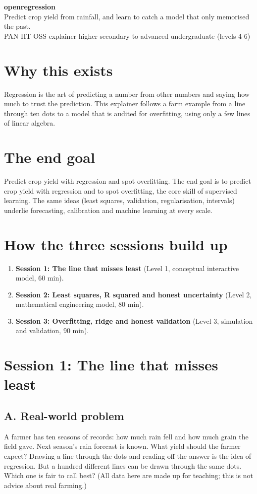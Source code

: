 \documentclass[11pt,a4paper]{article}
\begin{document}
\begin{center}{\LARGE\bfseries openregression}\\[0.4em]{\large Predict crop yield from rainfall, and learn to catch a model that only memorised the past.}\\[0.2em]\small PAN IIT OSS explainer \textbullet{} higher secondary to advanced undergraduate (levels 4-6)\end{center}

\section*{Why this exists}
Regression is the art of predicting a number from other numbers and saying how much to trust the prediction. This explainer follows a farm example from a line through ten dots to a model that is audited for overfitting, using only a few lines of linear algebra.

\section*{The end goal}
Predict crop yield with regression and spot overfitting. The end goal is to predict crop yield with regression and to spot overfitting, the core skill of supervised learning. The same ideas (least squares, validation, regularisation, intervals) underlie forecasting, calibration and machine learning at every scale.

\section*{How the three sessions build up}
\begin{enumerate}[nosep]
\item \textbf{Session 1: The line that misses least} (Level 1, conceptual interactive model, 60 min).
\item \textbf{Session 2: Least squares, R squared and honest uncertainty} (Level 2, mathematical engineering model, 80 min).
\item \textbf{Session 3: Overfitting, ridge and honest validation} (Level 3, simulation and validation, 90 min).
\end{enumerate}

\section{Session 1: The line that misses least}

\subsection*{A. Real-world problem}
A farmer has ten seasons of records: how much rain fell and how much grain the field gave. Next season's rain forecast is known. What yield should the farmer expect? Drawing a line through the dots and reading off the answer is the idea of regression. But a hundred different lines can be drawn through the same dots. Which one is fair to call best? (All data here are made up for teaching; this is not advice about real farming.)
\end{document}
